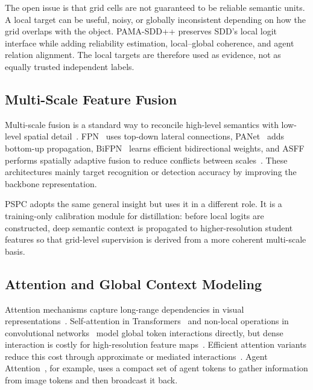 \documentclass[a4paper,fleqn]{cas-dc}
\begin{document}
The open issue is that grid cells are not guaranteed to be reliable semantic
units. A local target can be useful, noisy, or globally inconsistent depending
on how the grid overlaps with the object. PAMA-SDD++ preserves SDD's local
logit interface while adding reliability estimation, local--global coherence,
and agent relation alignment. The local targets are therefore used as
evidence, not as equally trusted independent labels.

\subsection{Multi-Scale Feature Fusion}
\label{subsec:multiscale}

Multi-scale fusion is a standard way to reconcile high-level semantics with
low-level spatial detail~\cite{qiao2021detectors,wang2021pvt,
xie2021segformer}. FPN~\cite{lin2017feature} uses top-down lateral
connections, PANet~\cite{liu2018panet} adds bottom-up propagation,
BiFPN~\cite{tan2020efficientdet} learns efficient bidirectional weights, and
ASFF~\cite{liu2019asff} performs spatially adaptive fusion to reduce conflicts
between scales~\cite{qiao2021detectors,wang2021pvt,liu2021swin}. These
architectures mainly target recognition or detection accuracy by improving the
backbone representation.

PSPC adopts the same general insight but uses it in a different role. It is a
training-only calibration module for distillation: before local logits are
constructed, deep semantic context is propagated to higher-resolution student
features so that grid-level supervision is derived from a more coherent
multi-scale basis.

\subsection{Attention and Global Context Modeling}
\label{subsec:attention}

Attention mechanisms capture long-range dependencies in visual
representations~\cite{dosovitskiy2021vit,liu2021swin,bao2022beit,he2022mae}.
Self-attention in Transformers~\cite{vaswani2017attention} and non-local
operations in convolutional networks~\cite{wang2018nonlocal} model global
token interactions directly, but dense interaction is costly for
high-resolution feature maps~\cite{wang2021pvt,liu2021swin,dong2022cswin,
wu2021cvt}. Efficient attention variants reduce this cost through approximate
or mediated interactions~\cite{katharopoulos2020linear,choromanski2021performer}.
Agent Attention~\cite{han2024agent}, for example, uses a compact set of agent
tokens to gather information from image tokens and then broadcast it back.
\end{document}
